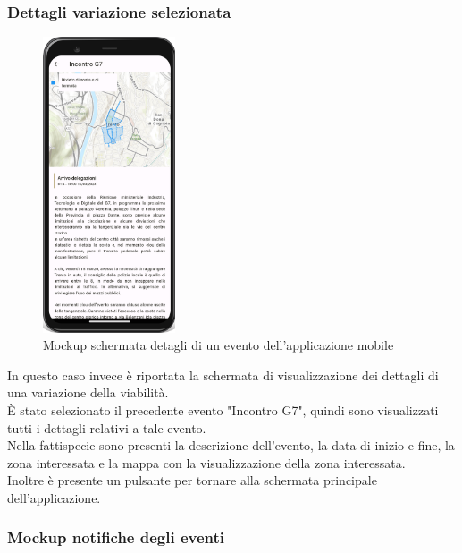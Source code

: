 \documentclass{article}
\begin{document}
\subsubsection{Dettagli variazione selezionata}
\begin{figure}[htbp]
    \label{4.1.2}
    \centering
    \includegraphics[width=0.35\textwidth]{Images/Mockup2 - Mobile.png}
    \caption{Mockup schermata detagli di un evento dell'applicazione mobile}
\end{figure}

In questo caso invece è riportata la schermata di visualizzazione dei dettagli di una variazione della viabilità.\\
È stato selezionato il precedente evento "Incontro G7", quindi sono visualizzati tutti i dettagli relativi a tale evento.\\
Nella fattispecie sono presenti la descrizione dell'evento, la data di inizio e fine, la zona interessata e la mappa con la visualizzazione della zona interessata.\\
Inoltre è presente un pulsante per tornare alla schermata principale dell'applicazione.\\
\clearpage

\subsubsection{Mockup notifiche degli eventi}
\end{document}

